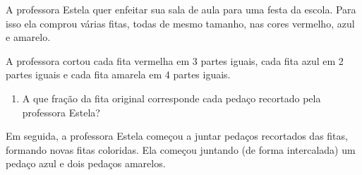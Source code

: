 \begin{atividade}[label=chap5-ativ2]{}


A professora Estela quer enfeitar sua sala de aula para uma festa da escola. Para isso ela comprou várias fitas, todas de mesmo tamanho, nas cores vermelho, azul e amarelo.

\begin{center}
\end{center}


A professora cortou cada fita vermelha em 3 partes iguais, cada fita azul em 2 partes iguais e cada fita amarela em 4 partes iguais.

\begin{center}
\end{center}

\begin{enumerate} [\quad a)] %
  \item     A que fração da fita original corresponde cada pedaço recortado pela professora Estela?
 \end{enumerate}

 Em seguida, a professora Estela começou a juntar pedaços recortados das fitas, formando novas fitas coloridas. Ela começou juntando (de forma intercalada) um pedaço azul e dois pedaços amarelos.     \mbox{} \newline

\begin{center}
\end{center}


\end{atividade}
